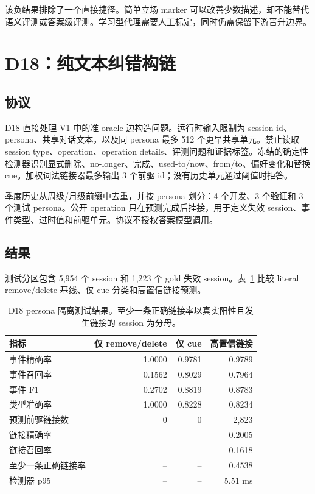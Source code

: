 该负结果排除了一个直接捷径。简单立场 marker 可以改善少数描述，却不能替代语义评测或答案级评测。学习型代理需要人工标定，同时仍需保留下游晋升边界。

\section{D18：纯文本纠错构链}
\label{sec:d18}

\subsection{协议}

D18 直接处理 V1 中的准 oracle 边构造问题。运行时输入限制为 session id、persona、共享对话文本，以及同 persona 最多 512 个更早共享单元。禁止读取 session type、operation、operation details、评测问题和证据标签。冻结的确定性检测器识别显式删除、no-longer、完成、used-to/now、from/to、偏好变化和替换 cue。加权词法链接器最多输出 3 个前驱 id；没有历史单元通过阈值时拒答。

季度历史从周级/月级前缀中去重，并按 persona 划分：4 个开发、3 个验证和 3 个测试 persona。公开 operation 只在预测完成后挂接，用于定义失效 session、事件类型、过时值和前驱单元。协议不授权答案模型调用。

\subsection{结果}

测试分区包含 5,954 个 session 和 1,223 个 gold 失效 session。表~\ref{tab:d18} 比较 literal remove/delete 基线、仅 cue 分类和高置信链接预测。

\begin{table}[H]
\centering
\footnotesize
\begin{tabular}{lrrr}
\toprule
指标 & 仅 remove/delete & 仅 cue & 高置信链接 \\
\midrule
事件精确率 & 1.0000 & 0.9781 & 0.9789 \\
事件召回率 & 0.1562 & 0.8029 & 0.7964 \\
事件 F1 & 0.2702 & 0.8819 & 0.8783 \\
类型准确率 & 1.0000 & 0.8228 & 0.8234 \\
预测前驱链接数 & 0 & 0 & 2,823 \\
链接精确率 & -- & -- & 0.2005 \\
链接召回率 & -- & -- & 0.1618 \\
至少一条正确链接率 & -- & -- & 0.4538 \\
检测器 p95 & -- & -- & 5.51 ms \\
\bottomrule
\end{tabular}
\caption{D18 persona 隔离测试结果。至少一条正确链接率以真实阳性且发生链接的 session 为分母。}
\label{tab:d18}
\end{table}

